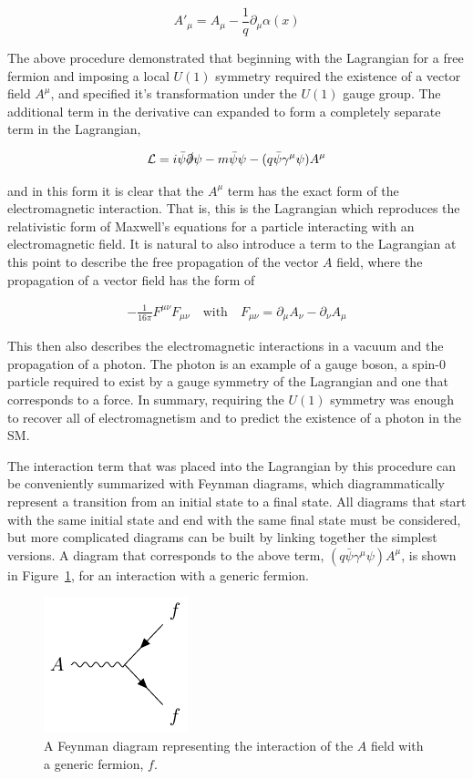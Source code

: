 \[  A'_\mu =  A_{\mu} - \frac{1}{q}\partial_\mu\alpha(x) \]

The above procedure demonstrated that beginning with the Lagrangian for a free fermion and imposing a local $U(1)$ symmetry required the existence of a vector field $A^\mu$, and specified it's transformation under the $U(1)$ gauge group.
The additional term in the derivative can expanded to form a completely separate term in the Lagrangian,

\begin{align}
\mathcal{L} = i\bar{\psi}\slashed{\partial}\psi -m\bar{\psi}\psi - (q\bar{\psi}\gamma^\mu\psi)A^\mu
\end{align}

\noindent and in this form it is clear that the $A^\mu$ term has the exact form of the electromagnetic interaction.
That is, this is the Lagrangian which reproduces the relativistic form of Maxwell's equations for a particle interacting with an electromagnetic field.
It is natural to also introduce a term to the Lagrangian at this point to describe the free propagation of the vector $A$ field, where the propagation of a vector field has the form of

\begin{align}
- \frac{1}{16\pi} F^{\mu\nu}F_{\mu\nu} \quad \mathrm{with} \quad F_{\mu\nu} = \partial_\mu A_\nu - \partial_\nu A_\mu
\end{align}

\noindent This then also describes the electromagnetic interactions in a vacuum and the propagation of a photon.
The photon is an example of a gauge boson, a spin-0 particle required to exist by a gauge symmetry of the Lagrangian and one that corresponds to a force.
In summary, requiring the $U(1)$ symmetry was enough to recover all of electromagnetism and to predict the existence of a photon in the \ac{SM}. 

The interaction term that was placed into the Lagrangian by this procedure can be conveniently summarized with Feynman diagrams, which diagrammatically represent a transition from an initial state to a final state.
All diagrams that start with the same initial state and end with the same final state must be considered, but more complicated diagrams can be built by linking together the simplest versions.
A diagram that corresponds to the above term, $(q\bar{\psi}\gamma^\mu\psi)A^\mu$, is shown in Figure~\ref{fig:feyn_aff}, for an interaction with a generic fermion.

\begin{figure}
\includegraphics[width=\halffig]{figures/feyn_aff.pdf}
\caption{A Feynman diagram representing the interaction of the $A$ field with a generic fermion, $f$.} 
\label{fig:feyn_aff}
\end{figure}


